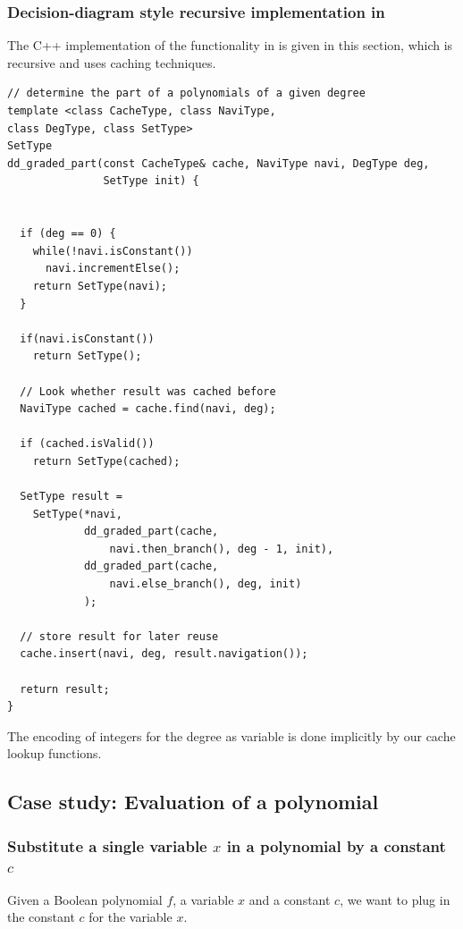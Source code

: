 \subsubsection{Decision-diagram style recursive implementation in \PolyBoRi}
The C++ implementation of the functionality in \PolyBoRi is given in this section, which is recursive and uses caching techniques.
{
\lstset{language=C++}
\begin{lstlisting}
// determine the part of a polynomials of a given degree
template <class CacheType, class NaviType, 
class DegType, class SetType>
SetType
dd_graded_part(const CacheType& cache, NaviType navi, DegType deg,  
               SetType init) {


  if (deg == 0) {
    while(!navi.isConstant())
      navi.incrementElse();
    return SetType(navi);
  }

  if(navi.isConstant())
    return SetType();

  // Look whether result was cached before
  NaviType cached = cache.find(navi, deg);

  if (cached.isValid())
    return SetType(cached);

  SetType result = 
    SetType(*navi,  
            dd_graded_part(cache, 
                navi.then_branch(), deg - 1, init),
            dd_graded_part(cache, 
                navi.else_branch(), deg, init)
            );

  // store result for later reuse
  cache.insert(navi, deg, result.navigation());

  return result;
}
\end{lstlisting}}
\lstset{language=[IPython]Python}
The encoding of integers for the degree as variable is done implicitly by our cache lookup functions.

\subsection{Case study: Evaluation of a polynomial}

\subsubsection{Substitute a single variable $x$ in a polynomial by a constant $c$}

Given a Boolean polynomial $f$, a variable $x$ and a constant $c$, we want to plug in the constant $c$ for the variable $x$.

